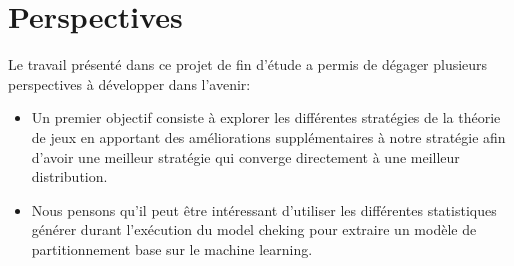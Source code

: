 \section*{Perspectives}
Le travail présenté dans ce projet de fin d'étude a permis de dégager plusieurs perspectives à développer dans l’avenir:
\begin{itemize}
	\item Un premier objectif consiste à explorer les différentes stratégies de la théorie de jeux en apportant des améliorations supplémentaires à notre stratégie afin d’avoir une meilleur stratégie qui converge directement à une meilleur distribution.
	\item Nous pensons qu’il peut être intéressant d'utiliser les différentes statistiques générer durant l'exécution du model cheking pour  extraire un modèle de partitionnement base sur le machine learning.
\end{itemize}
